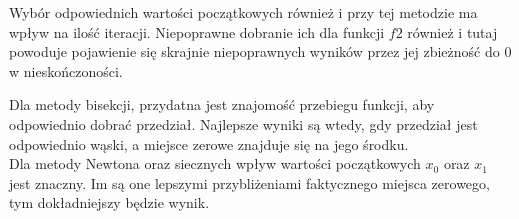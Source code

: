 \documentclass[15pt, a4paper]{article}
\begin{document}
\noindent Wybór odpowiednich wartości początkowych również i przy tej metodzie ma wpływ na ilość iteracji. Niepoprawne dobranie ich dla funkcji \(f2\) również i tutaj powoduje pojawienie się skrajnie niepoprawnych wyników przez jej zbieżność do 0 w nieskończoności. 


\noindent Dla metody bisekcji, przydatna jest znajomość przebiegu funkcji, aby odpowiednio dobrać przedział. Najlepsze wyniki są wtedy, gdy przedział jest odpowiednio wąski, a miejsce zerowe znajduje się na jego środku. \\
Dla metody Newtona oraz siecznych wpływ wartości początkowych \(x_0\) oraz \(x_1\) jest znaczny. Im są one lepszymi przybliżeniami faktycznego miejsca zerowego, tym dokładniejszy będzie wynik. 
\end{document}
